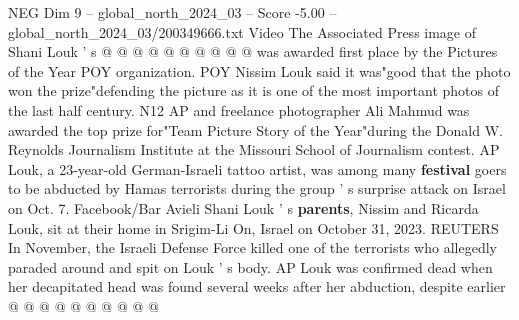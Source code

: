 \begin{textsample}{NEG Dim 9 – global\_north\_2024\_03 – Score -5.00 – global\_north\_2024\_03/200349666.txt}
Video The Associated Press image of Shani Louk ' s @ @ @ @ @ @ @ @ @ @ was awarded first place by the Pictures of the Year POY organization.
POY Nissim Louk said it was"good that the photo won the prize"defending the picture as it is one of the most important photos of the last half century.
N12 AP and freelance photographer Ali Mahmud was awarded the top prize for"Team Picture Story of the Year"during the Donald W.
Reynolds Journalism Institute at the Missouri School of Journalism contest.
AP Louk, a 23-year-old German-Israeli tattoo artist, was among many \textbf{festival} goers to be abducted by Hamas terrorists during the group ' s surprise attack on Israel on Oct. 7.
Facebook/Bar Avieli Shani Louk ' s \textbf{parents}, Nissim and Ricarda Louk, sit at their home in Srigim-Li On, Israel on October 31, 2023.
REUTERS In November, the Israeli Defense Force killed one of the terrorists who allegedly paraded around and spit on Louk ' s body.
AP Louk was confirmed dead when her decapitated head was found several weeks after her abduction, despite earlier @ @ @ @ @ @ @ @ @ @

\end{textsample}
